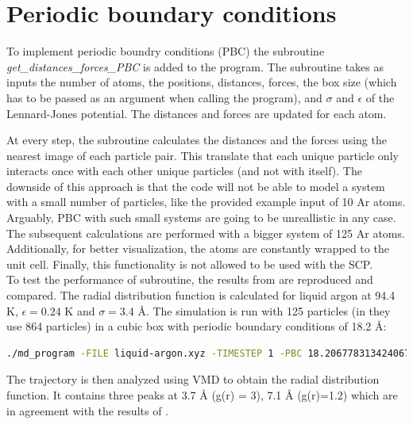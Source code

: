 \documentclass{cis320}
\begin{document}
\section{Periodic boundary conditions}

To implement periodic boundry conditions (PBC) the subroutine \textit{get\_distances\_forces\_PBC} is added to the program. The subroutine takes as inputs the number of atoms, the positions, distances, forces, the box size (which has to be passed as an argument when calling the program), and $\sigma$ and $\epsilon$ of the Lennard-Jones potential. The distances and forces are updated for each atom.\\
\par
At every step, the subroutine calculates the distances and the forces using the nearest image of each particle pair. This translate that each unique particle only interacts once with each other unique particles (and not with itself). The downside of this approach is that the code will not be able to model a system with a small number of particles, like the provided example input of 10 Ar atoms. Arguably, PBC with such small systems are going to be unreallistic in any case. The subsequent calculations are performed with a bigger system of 125 Ar atoms.\\
Additionally, for better visualization, the atoms are constantly wrapped to the unit cell. Finally, this functionality is not allowed to be used with the SCP.\\

To test the performance of subroutine, the results from \cite{rahman1964correlations} are reproduced and compared. The radial distribution function is calculated for liquid argon at 94.4 K, $\epsilon=0.24$ K and $\sigma=3.4$ Å. The simulation is run with 125 particles (in \cite{rahman1964correlations} they use 864 particles) in a cubic box with periodic boundary conditions of 18.2 Å:

\begin{lstlisting}[language=bash]
    ./md_program -FILE liquid-argon.xyz -TIMESTEP 1 -PBC 18.206778313424067 -SAVEFREQ 100 -MAX_MD_STEPS 10000 -THERMO BEREN 10 -TEMP 94.4 -EPS 0.23846451108000002 -SIGMA 3.4 \end{lstlisting}

The trajectory is then analyzed using VMD to obtain the radial distribution function. It contains three peaks at 3.7 Å (g(r) = 3), 7.1 Å (g(r)=1.2) which are in agreement with the results of \cite{rahman1964correlations}.
\end{document}
